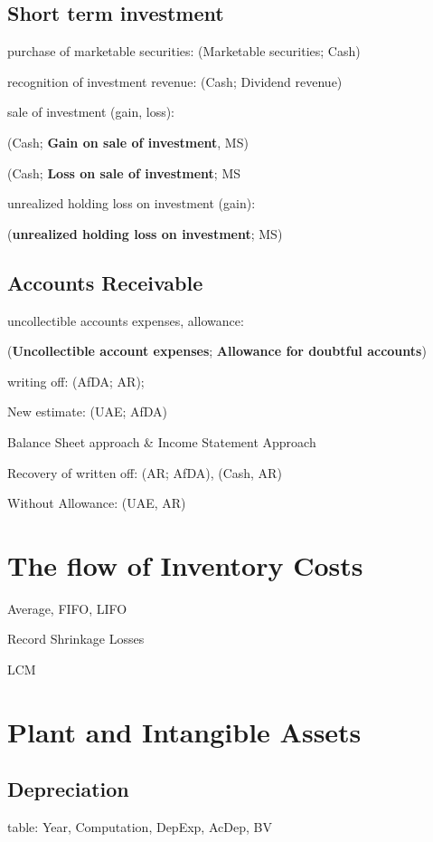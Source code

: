 \documentclass[10pt, a4paper]{article}
\begin{document}
\subsection*{Short term investment}
    purchase of marketable securities: (Marketable securities; Cash) 

    recognition of investment revenue: (Cash; Dividend revenue)

    sale of investment (gain, loss):
    
    \quad (Cash; \textbf{Gain on sale of investment}, MS)

    \quad (Cash; \textbf{Loss on sale of investment}; MS
     
    unrealized holding loss on investment (gain):

    \quad (\textbf{unrealized holding loss on investment}; MS)

\subsection*{Accounts Receivable}
    uncollectible accounts expenses, allowance:

    \quad (\textbf{Uncollectible account expenses}; \textbf{Allowance for doubtful accounts})

    writing  off: (AfDA; AR);

    New estimate: (UAE; AfDA)

    Balance Sheet approach \& Income Statement Approach 

    Recovery of written off: (AR; AfDA), (Cash, AR) 

    Without Allowance: (UAE, AR)

\section*{The flow of Inventory Costs}
    Average, FIFO, LIFO

    Record Shrinkage Losses

    LCM

\section*{Plant and Intangible Assets}
\subsection*{Depreciation}
    table: Year, Computation, DepExp, AcDep, BV
\end{document}
